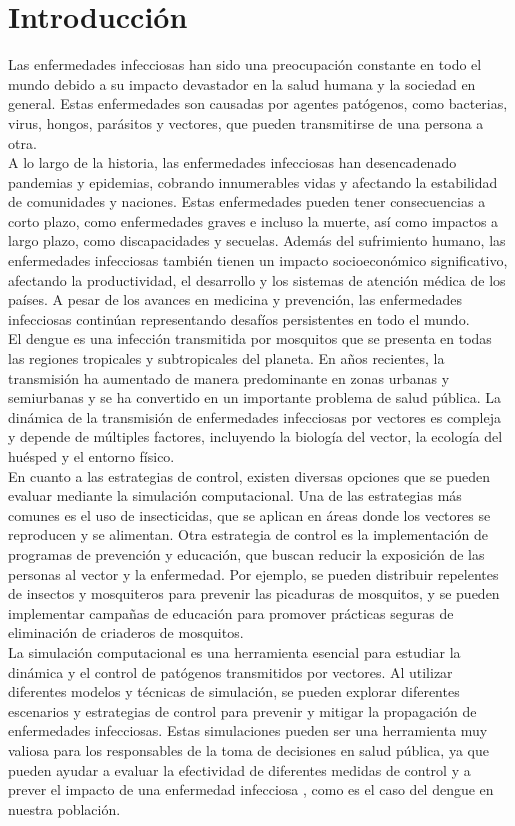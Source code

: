 \chapter*{Introducción}\label{chapter:introduction}
Las enfermedades infecciosas han sido una preocupación constante en todo el mundo debido 
a su impacto devastador en la salud humana y la sociedad en general. Estas enfermedades 
son causadas por agentes patógenos, como bacterias, virus, hongos, parásitos y vectores, que pueden 
transmitirse de una persona a otra. \\
A lo largo de la historia, las enfermedades infecciosas 
han desencadenado pandemias y epidemias, cobrando innumerables vidas y afectando la estabilidad 
de comunidades y naciones. Estas enfermedades pueden tener consecuencias a corto plazo, como 
enfermedades graves e incluso la muerte, así como impactos a largo plazo, como discapacidades y 
secuelas. Además del sufrimiento humano, las enfermedades infecciosas también tienen un impacto 
socioeconómico significativo, afectando la productividad, el desarrollo y los sistemas de atención 
médica de los países. A pesar de los avances en medicina y prevención, las enfermedades infecciosas 
continúan representando desafíos persistentes en todo el mundo. \\
El dengue es una infección transmitida por mosquitos que se presenta en todas
las regiones tropicales y subtropicales del planeta. En años recientes, la transmisión
ha aumentado de manera predominante en zonas urbanas y semiurbanas y se ha convertido 
en un importante problema de salud pública. La dinámica de la transmisión
de enfermedades infecciosas por vectores es compleja y depende de múltiples factores, 
incluyendo la biología del vector, la ecología del huésped y el entorno físico. \\ 
En cuanto a las estrategias de control, existen diversas opciones que se pueden
evaluar mediante la simulación computacional. Una de las estrategias más comunes es
el uso de insecticidas, que se aplican en áreas donde los vectores se reproducen y se
alimentan. Otra estrategia de control es la implementación de programas de prevención y
educación, que buscan reducir la exposición de las personas al vector y la enfermedad.
Por ejemplo, se pueden distribuir repelentes de insectos y mosquiteros para prevenir
las picaduras de mosquitos, y se pueden implementar campañas de educación para
promover prácticas seguras de eliminación de criaderos de mosquitos. \autocite{Gubler1995}\\
La simulación computacional es una herramienta esencial para estudiar la dinámica y 
el control de patógenos transmitidos por vectores. Al utilizar diferentes modelos
y técnicas de simulación, se pueden explorar diferentes escenarios y estrategias de
control para prevenir y mitigar la propagación de enfermedades infecciosas. Estas 
simulaciones pueden ser una herramienta muy valiosa para los responsables de la toma
de decisiones en salud pública, ya que pueden ayudar a evaluar la efectividad de 
diferentes medidas de control y a prever el impacto de una enfermedad infecciosa \autocite{Epstein2008}, como
es el caso del dengue en nuestra población. \\

